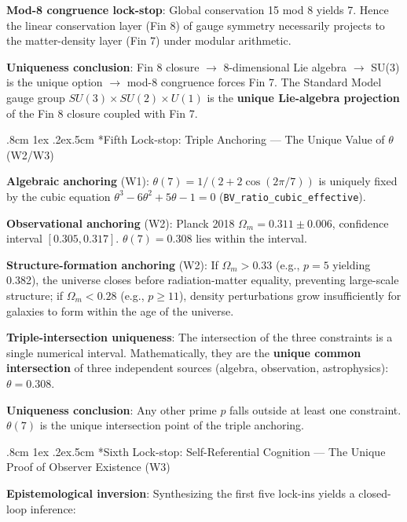 \documentclass[aps,prd,twocolumn,nofootinbib,floatfix]{revtex4-2}
\makeatletter
\def\subsubsection{%
  \@startsection{subsubsection}{3}{\z@}
    {.8cm \@plus1ex \@minus .2ex}{.5cm}
    {\normalfont\normalsize\itshape\centering}%
}
\makeatother
\begin{document}
\textbf{Mod-8 congruence lock-stop}: Global conservation 15 mod 8 yields 7. Hence the linear conservation layer (Fin 8) of gauge symmetry necessarily projects to the matter-density layer (Fin 7) under modular arithmetic.

\textbf{Uniqueness conclusion}: Fin 8 closure $\to$ 8-dimensional Lie algebra $\to$ SU(3) is the unique option $\to$ mod-8 congruence forces Fin 7. The Standard Model gauge group $SU(3)\times SU(2)\times U(1)$ is the \textbf{unique Lie-algebra projection} of the Fin 8 closure coupled with Fin 7.

\subsubsection*{Fifth Lock-stop: Triple Anchoring --- The Unique Value of $\theta$ (W2/W3)}

\textbf{Algebraic anchoring} (W1): $\theta(7) = 1/(2+2\cos(2\pi/7))$ is uniquely fixed by the cubic equation $\theta^3 - 6\theta^2 + 5\theta - 1 = 0$ (\texttt{BV\_ratio\_cubic\_effective}).

\textbf{Observational anchoring} (W2): Planck 2018 $\Omega_m = 0.311 \pm 0.006$, confidence interval $[0.305, 0.317]$. $\theta(7) = 0.308$ lies within the interval.

\textbf{Structure-formation anchoring} (W2): If $\Omega_m > 0.33$ (e.g., $p=5$ yielding 0.382), the universe closes before radiation-matter equality, preventing large-scale structure; if $\Omega_m < 0.28$ (e.g., $p\geq 11$), density perturbations grow insufficiently for galaxies to form within the age of the universe.

\textbf{Triple-intersection uniqueness}: The intersection of the three constraints is a single numerical interval. Mathematically, they are the \textbf{unique common intersection} of three independent sources (algebra, observation, astrophysics): $\theta = 0.308$.

\textbf{Uniqueness conclusion}: Any other prime $p$ falls outside at least one constraint. $\theta(7)$ is the unique intersection point of the triple anchoring.

\subsubsection*{Sixth Lock-stop: Self-Referential Cognition --- The Unique Proof of Observer Existence (W3)}

\textbf{Epistemological inversion}: Synthesizing the first five lock-ins yields a closed-loop inference:
\end{document}
